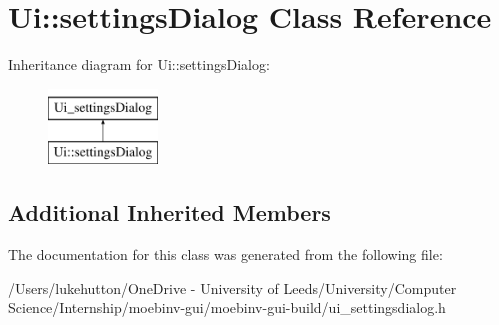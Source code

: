 \hypertarget{class_ui_1_1settings_dialog}{}\section{Ui\+:\+:settings\+Dialog Class Reference}
\label{class_ui_1_1settings_dialog}
Inheritance diagram for Ui\+:\+:settings\+Dialog\+:\begin{figure}[H]
\begin{center}
\leavevmode
\includegraphics[height=2.000000cm]{class_ui_1_1settings_dialog}
\end{center}
\end{figure}
\subsection*{Additional Inherited Members}


The documentation for this class was generated from the following file\+:\begin{DoxyCompactItemize}
\item 
/\+Users/lukehutton/\+One\+Drive -\/ University of Leeds/\+University/\+Computer Science/\+Internship/moebinv-\/gui/moebinv-\/gui-\/build/ui\+\_\+settingsdialog.\+h\end{DoxyCompactItemize}
